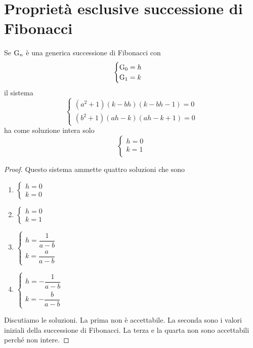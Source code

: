 \section{Proprietà esclusive successione di Fibonacci}
\begin{thm}\label{thm:FibSistCaratteristico}
Se $\mathrm{G}_{n}$ è una generica successione di Fibonacci con
\[\begin{cases}
\mathrm{G}_{0}=h\\
\mathrm{G}_{1}=k\\
\end{cases}\] il sistema 
\begin{equation*}
	\left\{
\begin{aligned}
	(a^2+1)(k-bh)(k-bh-1)=0\\
	(b^2+1)(ah-k)(ah-k+1)=0
\end{aligned}
\right.
\end{equation*}
ha come soluzione intera solo \[\begin{cases}
	h=0\\
	k=1\\
\end{cases}\]
\end{thm}
\begin{proof}
Questo sistema ammette quattro soluzioni che sono
\begin{enumerate}
	\item $\left\{
	\begin{aligned}
		h=0\\
		k=0
	\end{aligned}
	\right.$
	\item $\left\{
	\begin{aligned}
		h=0\\
		k=1
	\end{aligned}
	\right.$
	\item $\left\{
	\begin{aligned}
		h=\dfrac{1}{a-b}\\
		k=\dfrac{a}{a-b}
	\end{aligned}
	\right.$
	\item $\left\{
	\begin{aligned}
		h=-\dfrac{1}{a-b}\\
		k=-\dfrac{b}{a-b}
	\end{aligned}
	\right.$
\end{enumerate}
Discutiamo le soluzioni. La prima non è accettabile. La seconda sono i valori 
iniziali della successione di Fibonacci.
La terza e la quarta non sono accettabili perché non intere. 
\end{proof}
